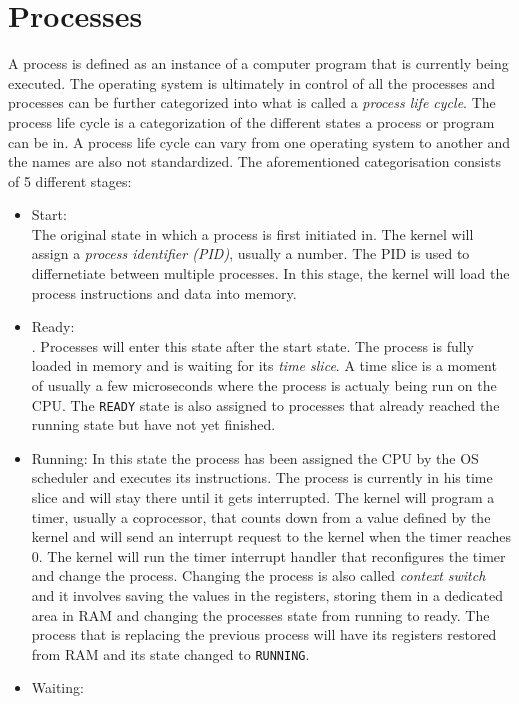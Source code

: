 \section{Processes}

A process is defined as an instance of a computer program that is currently being executed.
The operating system is ultimately in control of all the processes and 
processes can be further categorized into what is called a \textit{process life cycle}. The process life cycle is
a categorization of the different states a process or program can be in. A process life cycle can vary
from one operating system to another and the names are also not standardized. The aforementioned 
categorisation consists of 5 different stages:

\begin{itemize}
\item Start: \\
	The original state in which a process is first initiated in. The kernel will assign a \textit{process identifier (PID)},
	usually a number. The PID is used to differnetiate between multiple processes. In this stage, the kernel will load the
	process instructions and data into memory.
\item Ready: \\
.	Processes will enter this state after the start state. The process is fully loaded in memory and is waiting for its \textit{time slice}.
		A time slice is a moment of usually a few microseconds where the process is actualy being run on the CPU. The \texttt{READY} state
		is also assigned to processes that already reached the running state but have not yet finished.
\item Running:
In this state the process has been assigned the CPU by the OS scheduler and executes its instructions. The process is currently in his time slice
and will stay there until it gets interrupted. The kernel will program a timer, usually a coprocessor, that counts down from a value defined by
		the kernel and will send an interrupt request to the kernel when the timer reaches 0. The kernel will run the timer interrupt handler
		that reconfigures the timer and change the process. Changing the process is also called \textit{context switch} and it involves
		saving the values in the registers, storing them in a dedicated area in RAM and changing the processes state from running to ready.
		The process that is replacing the previous process will have its registers restored from RAM and its state changed to \texttt{RUNNING}.
\item Waiting: \\

\end{itemize}

